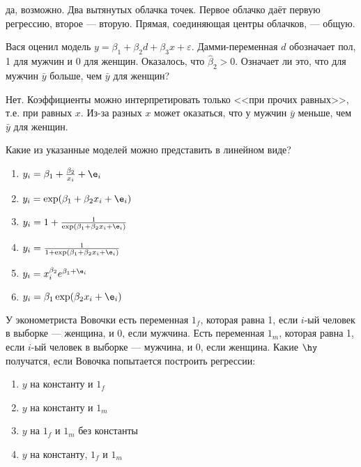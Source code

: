 \documentclass[pdftex,11pt,openany]{book}\usepackage[]{graphicx}\usepackage[]{color}
\begin{document}
\begin{solution}
да, возможно. Два вытянутых облачка точек. Первое облачко даёт первую регрессию, второе --- вторую. Прямая, соединяющая центры облачков, --- общую.
\end{solution}



\begin{problem}
 Вася оценил модель $y=\beta_1+\beta_2 d+\beta_3 x+\varepsilon$. Дамми-переменная $d$ обозначает пол, 1 для мужчин и 0 для женщин. Оказалось, что $\hat{\beta}_2>0$. Означает ли это, что для мужчин $\bar{y}$ больше, чем $\bar{y}$ для женщин?
\end{problem}

\begin{solution}
Нет. Коэффициенты можно интерпретировать только <<при прочих равных>>, т.е. при равных $x$. Из-за разных $x$ может оказаться, что у мужчин $\bar{y}$ меньше, чем $\bar{y}$ для женщин.
\end{solution}



\begin{problem}
 Какие из указанные моделей можно представить в линейном виде?
\begin{enumerate}
\item $y_i=\beta_1+\frac{\beta_2}{x_i}+\e_i$
\item $y_i=\exp(\beta_1+\beta_2 x_i+\e_i)$
\item $y_i=1+\frac{1}{\exp(\beta_1+\beta_2 x_i+\e_i)}$
\item $y_i=\frac{1}{1+\exp(\beta_1+\beta_2 x_i+\e_i)}$
\item $y_i=x_i^{\beta_2}e^{\beta_1+\e_i}$
\item $y_i=\beta_1\exp(\beta_2 x_i + \e_i)$
\end{enumerate}
\end{problem}

\begin{solution}
\newpage
\end{solution}



\begin{problem}
 У эконометриста Вовочки есть переменная $1_f$, которая равна 1, если $i$-ый человек в выборке --- женщина, и 0, если мужчина. Есть переменная $1_m$, которая равна 1, если $i$-ый человек в выборке --- мужчина, и 0, если женщина. Какие $\hy$ получатся, если Вовочка попытается построить регрессии:
\begin{enumerate}
\item $y$ на константу и $1_f$
\item $y$ на константу и $1_m$
\item $y$ на $1_f$ и $1_m$ без константы
\item $y$ на константу, $1_f$ и $1_m$
\end{enumerate}
\end{problem}
\end{document}
